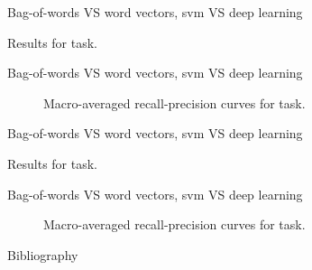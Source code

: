 \begin{frame}{Bag-of-words VS word vectors, \acs{svm} VS deep learning}
\begin{table}
  \centering
  \caption{Results for \type{} task.}
  \footnotesize
  
\end{table}
\end{frame}

\begin{frame}{Bag-of-words VS word vectors, \acs{svm} VS deep learning}
\begin{figure}
  \centering
  \resizebox{0.9\textwidth}{!}{}
  \caption{Macro-averaged recall-precision curves for \type{} task.}
\end{figure}

\end{frame}

\begin{frame}{Bag-of-words VS word vectors, \acs{svm} VS deep learning}
\begin{table}
  \centering
  \caption{Results for \behaviour{} task.}
  \footnotesize
  
\end{table}
\end{frame}

\begin{frame}{Bag-of-words VS word vectors, \acs{svm} VS deep learning}
\begin{figure}
  \centering
  \resizebox{0.9\textwidth}{!}{}
  \caption{Macro-averaged recall-precision curves for \behaviour{} task.}
\end{figure}

\end{frame}

\begin{frame}[allowframebreaks]{Bibliography}
  \scriptsize
  

\end{frame}


\backupend




